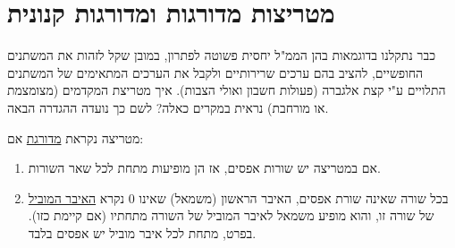 \documentclass[
  hebrew,
  12pt,
  a4paper,
  oneside]{book}
\theoremstyle{definition}
\theoremstyle{remark}
\theoremstyle{plain}
\theoremstyle{remark}
\begin{document}
\section{מטריצות מדורגות ומדורגות
קנונית}\label{ux5deux5d8ux5e8ux5d9ux5e6ux5d5ux5ea-ux5deux5d3ux5d5ux5e8ux5d2ux5d5ux5ea-ux5d5ux5deux5d3ux5d5ux5e8ux5d2ux5d5ux5ea-ux5e7ux5e0ux5d5ux5e0ux5d9ux5ea}

כבר נתקלנו בדוגמאות בהן הממ"ל יחסית פשוטה לפתרון, במובן שקל לזהות את
המשתנים החופשיים, להציב בהם ערכים שרירותיים ולקבל את הערכים המתאימים של
המשתנים התלויים ע"י קצת אלגברה (פעולות חשבון ואולי הצבות). איך מטריצת
המקדמים (מצומצמת או מורחבת) נראית במקרים כאלה? לשם כך נועדה ההגדרה הבאה.

\begin{definition}

מטריצה נקראת \ul{מדורגת} אם:

\begin{enumerate}
\def\labelenumi{\arabic{enumi}.}
\item
  אם במטריצה יש שורות אפסים, אז הן מופיעות מתחת לכל שאר השורות.
\item
  בכל שורה שאינה שורת אפסים, האיבר הראשון (משמאל) שאינו \(0\) נקרא
  \ul{האיבר המוביל} של שורה זו, והוא מופיע משמאל לאיבר המוביל של השורה
  מתחתיו (אם קיימת כזו). בפרט, מתחת לכל איבר מוביל יש אפסים בלבד.
\end{enumerate}

\end{definition}
\end{document}
